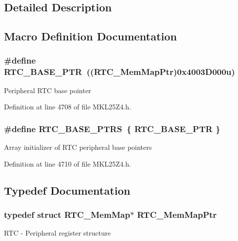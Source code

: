 \subsection{Detailed Description}


\subsection{Macro Definition Documentation}
\subsubsection[{\texorpdfstring{R\+T\+C\+\_\+\+B\+A\+S\+E\+\_\+\+P\+TR}{RTC_BASE_PTR}}]{\setlength{\rightskip}{0pt plus 5cm}\#define R\+T\+C\+\_\+\+B\+A\+S\+E\+\_\+\+P\+TR~(({\bf R\+T\+C\+\_\+\+Mem\+Map\+Ptr})0x4003\+D000u)}\hypertarget{group___r_t_c___peripheral_ga6455e2b767b4b224b4f00b50e87a2441}{}\label{group___r_t_c___peripheral_ga6455e2b767b4b224b4f00b50e87a2441}
Peripheral R\+TC base pointer 

Definition at line 4708 of file M\+K\+L25\+Z4.\+h.

\subsubsection[{\texorpdfstring{R\+T\+C\+\_\+\+B\+A\+S\+E\+\_\+\+P\+T\+RS}{RTC_BASE_PTRS}}]{\setlength{\rightskip}{0pt plus 5cm}\#define R\+T\+C\+\_\+\+B\+A\+S\+E\+\_\+\+P\+T\+RS~\{ {\bf R\+T\+C\+\_\+\+B\+A\+S\+E\+\_\+\+P\+TR} \}}\hypertarget{group___r_t_c___peripheral_ga426dff8af34f3304d58b5bed5a54e583}{}\label{group___r_t_c___peripheral_ga426dff8af34f3304d58b5bed5a54e583}
Array initializer of R\+TC peripheral base pointers 

Definition at line 4710 of file M\+K\+L25\+Z4.\+h.



\subsection{Typedef Documentation}
\subsubsection[{\texorpdfstring{R\+T\+C\+\_\+\+Mem\+Map\+Ptr}{RTC_MemMapPtr}}]{\setlength{\rightskip}{0pt plus 5cm}typedef struct {\bf R\+T\+C\+\_\+\+Mem\+Map}$\ast$ {\bf R\+T\+C\+\_\+\+Mem\+Map\+Ptr}}\hypertarget{group___r_t_c___peripheral_gac92da66fe1171e5751505df29917b152}{}\label{group___r_t_c___peripheral_gac92da66fe1171e5751505df29917b152}
R\+TC -\/ Peripheral register structure 